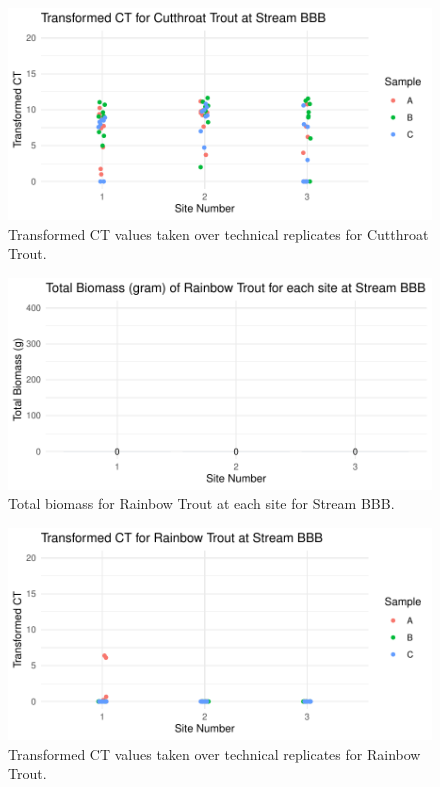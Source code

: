 \begin{figure}[H]
\centering
\includegraphics{AppendixImages/BBB_ct_tct.pdf}
\caption{    Transformed CT values taken over technical replicates for Cutthroat Trout.}
\label{fig:BBB_ct}
\end{figure}




\begin{figure}[H]
\centering
\includegraphics{AppendixImages/BBB_Rb_new.pdf}
\caption{    Total biomass for Rainbow Trout at each site for Stream BBB.}
\label{fig:testBBBbiomRb}
\end{figure}




\begin{figure}[H]
\centering
\includegraphics{AppendixImages/BBB_rb_tct.pdf}
\caption{   Transformed CT values taken over technical replicates for Rainbow Trout.}
\label{fig:BBB_rb}
\end{figure}







